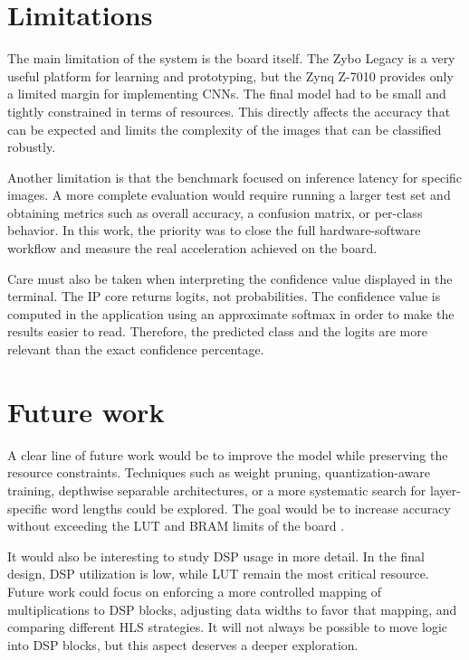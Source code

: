 \section*{Limitations}
The main limitation of the system is the board itself. The Zybo Legacy is a very useful
platform for learning and prototyping, but the Zynq Z-7010 provides only a limited margin
for implementing CNNs. The final model had to be small and tightly constrained in terms
of resources. This directly affects the accuracy that can be expected and limits the
complexity of the images that can be classified robustly.

Another limitation is that the benchmark focused on inference latency for specific
images. A more complete evaluation would require running a larger test set and obtaining
metrics such as overall accuracy, a confusion matrix, or per-class behavior. In this
work, the priority was to close the full hardware-software workflow and measure the real
acceleration achieved on the board.

Care must also be taken when interpreting the confidence value displayed in the
terminal. The \ac{IP} core returns logits, not probabilities. The confidence value is
computed in the application using an approximate softmax in order to make the results
easier to read. Therefore, the predicted class and the logits are more relevant than the
exact confidence percentage.

\section*{Future work}
A clear line of future work would be to improve the model while preserving the resource
constraints. Techniques such as weight pruning, quantization-aware training,
depthwise separable architectures, or a more systematic search for layer-specific word
lengths could be explored. The goal would be to increase accuracy without exceeding the
\ac{LUT} and \ac{BRAM} limits of the board
\citep{han2015deep,howard2017mobilenetsefficientconvolutionalneural}.

It would also be interesting to study \ac{DSP} usage in more detail. In the final design, DSP
utilization is low, while \ac{LUT} remain the most critical resource. Future work could
focus on enforcing a more controlled mapping of multiplications to \ac{DSP} blocks, adjusting
data widths to favor that mapping, and comparing different \ac{HLS} strategies. It will not
always be possible to move logic into \ac{DSP} blocks, but this aspect deserves a deeper
exploration.

